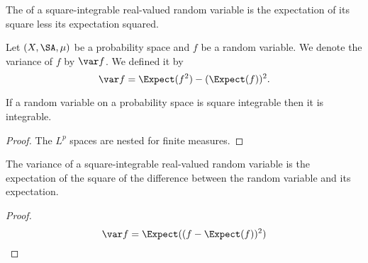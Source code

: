 

The 
of a square-integrable
real-valued random variable
is the expectation of its
square less its expectation
squared.


Let $(X, \SA, \mu)$
be a probability space
and $f$ be a random variable.
We denote the variance
of $f$ by $\var f$.
We defined it by
\[
  \var f = \Expect(f^2) - (\Expect(f))^2.
\]


\begin{prop}
  If a random
  variable on a probability
  space is square integrable
  then it is integrable.
  \begin{proof}
    The $L^p$ spaces are nested
    for finite measures.
  \end{proof}
\end{prop}

\begin{prop}
The variance of a
square-integrable
real-valued random
variable is
the expectation
of the square of
the difference between
the random variable
and its expectation.
\begin{proof}
\[
  \var f = \Expect((f - \Expect(f))^2)
\]
\end{proof}
\end{prop}
